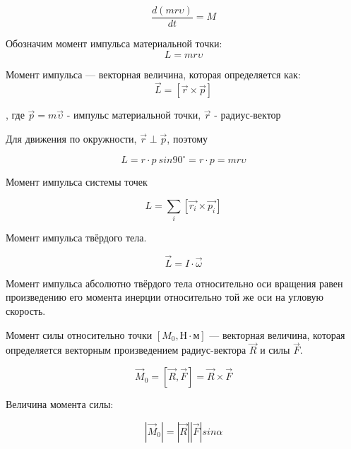 $$\frac{d(mr\upsilon)}{dt}=M$$

\begin{definition}
    Обозначим момент импульса материальной точки:
    $$L=mr\upsilon$$
\end{definition}

\begin{definition}
    Момент импульса — векторная величина, которая определяется как:
    $$\vec L=[\vec r\times\vec p]$$
\end{definition}

, где $\vec p=m\vec\upsilon$ - импульс материальной точки,
$\vec r$ - радиус-вектор

Для движения по окружности, $\vec r\perp\vec p$, поэтому

$$L=r\cdot p\ sin90^\circ=r\cdot p=mr\upsilon$$

Момент импульса системы точек 

$$L=\sum\limits_i [\vec{r_i}\times\vec{p_i}]$$

Момент импульса твёрдого тела.

$$\vec L=I\cdot\vec\omega$$

Момент импульса абсолютно твёрдого тела относительно оси вращения равен произведению его момента инерции относительно той же оси 
на угловую скорость.

\begin{definition}
    Момент силы относительно точки $[M_0, Н\cdot м]$ — векторная величина, 
    которая определяется векторным произведением радиус-вектора $\vec R$ и силы $\vec F$.
\end{definition}

$$\vec M_0=[\vec R,\vec F]=\vec R\times\vec F$$

Величина момента силы:

$$|\vec M_0|=|\vec R||\vec F|sin\alpha$$

